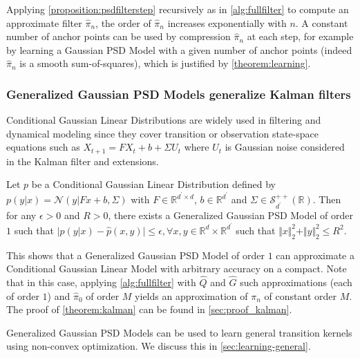 Applying \cref{proposition:psdfilterstep} recursively as in \cref{alg:fullfilter} to compute an approximate filter $\hat \pi_n$, the order of $\hat\pi_n$ increases exponentially with $n$. A constant number of anchor points can be used by compression $\hat\pi_n$ at each step, for example by learning a Gaussian PSD Model with a given number of anchor points (indeed $\hat\pi_n$ is a smooth sum-of-squares), which is justified by \cref{theorem:learning}.

\subsubsection{Generalized Gaussian PSD Models generalize Kalman filters}

Conditional Gaussian Linear Distributions are widely used in filtering and dynamical modeling since they cover transition or observation state-space equations such as $X_{t+1} = FX_t + b + \Sigma U_t$ where $U_t$ is Gaussian noise considered in the Kalman filter and extensions.

\begin{theorem}\label{theorem:kalman}
Let $p$ be a Conditional Gaussian Linear Distribution defined by $p(y | x) = \mathcal N(y | Fx + b, \Sigma)$ with $F\in\mathbb R^{d ^\prime\times d}$, $b\in\mathbb R^{d^\prime}$ and $\Sigma\in\mathcal S^{++}_{d^\prime}(\mathbb R)$. Then for any $\epsilon>0$ and $R>0$, there exists a Generalized Gaussian PSD Model of order $1$ such that $\vert p(y | x) - \hat p(x, y) \vert \leq \epsilon, $$\forall x, y \in \mathbb R^d \times \mathbb R^{d^\prime}$ such that $\Vert x\Vert_2^2 + \Vert y \Vert_2^2 \leq R^2$.
\end{theorem}

This shows that a Generalized Gaussian PSD Model of order $1$ can approximate a Conditional Gaussian Linear Model with arbitrary accuracy on a compact. Note that in this case, applying \cref{alg:fullfilter} with $\hat Q$ and $\hat G$ such approximations (each of order $1$) and $\hat\pi_0$ of order $M$ yields an approximation of $\pi_n$ of constant order $M$. The proof of \cref{theorem:kalman} can be found in \cref{sec:proof_kalman}.

Generalized Gaussian PSD Models can be used to learn general transition kernels using non-convex optimization. We discuss this in \cref{sec:learning-general}.
